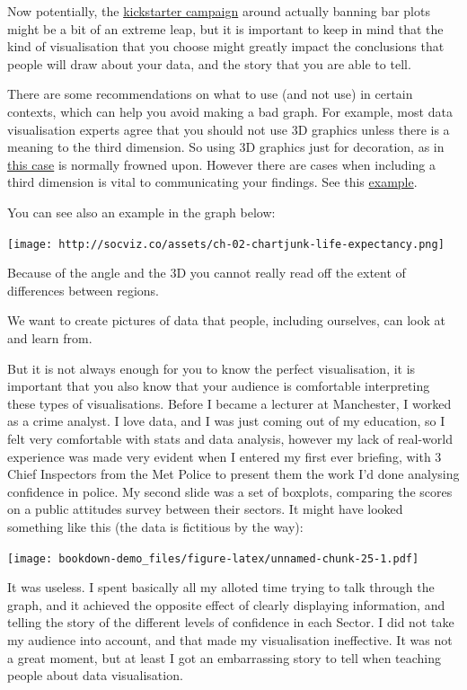 \documentclass[]{book}
\theoremstyle{definition}
\theoremstyle{definition}
\theoremstyle{definition}
\theoremstyle{remark}
\begin{document}
Now potentially, the
\href{https://www.kickstarter.com/projects/1474588473/barbarplots/description}{kickstarter
campaign} around actually banning bar plots might be a bit of an extreme
leap, but it is important to keep in mind that the kind of visualisation
that you choose might greatly impact the conclusions that people will
draw about your data, and the story that you are able to tell.

There are some recommendations on what to use (and not use) in certain
contexts, which can help you avoid making a bad graph. For example, most
data visualisation experts agree that you should not use 3D graphics
unless there is a meaning to the third dimension. So using 3D graphics
just for decoration, as in
\href{https://mir-s3-cdn-cf.behance.net/project_modules/disp/2505dd10837923.56030acd2ef20.jpg}{this
case} is normally frowned upon. However there are cases when including a
third dimension is vital to communicating your findings. See this
\href{http://www.visualisingdata.com/2015/03/when-3d-works/}{example}.

You can see also an example in the graph below:

\texttt{[image: http://socviz.co/assets/ch-02-chartjunk-life-expectancy.png]}

Because of the angle and the 3D you cannot really read off the extent of
differences between regions.

We want to create pictures of data that people, including ourselves, can
look at and learn from.

But it is not always enough for you to know the perfect visualisation,
it is important that you also know that your audience is comfortable
interpreting these types of visualisations. Before I became a lecturer
at Manchester, I worked as a crime analyst. I love data, and I was just
coming out of my education, so I felt very comfortable with stats and
data analysis, however my lack of real-world experience was made very
evident when I entered my first ever briefing, with 3 Chief Inspectors
from the Met Police to present them the work I'd done analysing
confidence in police. My second slide was a set of boxplots, comparing
the scores on a public attitudes survey between their sectors. It might
have looked something like this (the data is fictitious by the way):

\texttt{[image: bookdown-demo\_files/figure-latex/unnamed-chunk-25-1.pdf]}

It was useless. I spent basically all my alloted time trying to talk
through the graph, and it achieved the opposite effect of clearly
displaying information, and telling the story of the different levels of
confidence in each Sector. I did not take my audience into account, and
that made my visualisation ineffective. It was not a great moment, but
at least I got an embarrassing story to tell when teaching people about
data visualisation.
\end{document}
